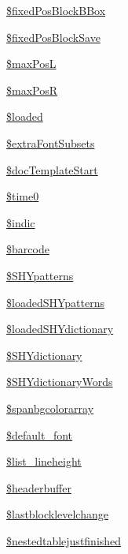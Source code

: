 \begin{DoxyCompactItemize}
\item 
\hyperlink{classm_p_d_f_a6e6d982ac950e78e0e113e46bcd06ccd}{\$fixed\-Pos\-Block\-B\-Box}
\item 
\hyperlink{classm_p_d_f_a64fbbded26ff8ab5ab8451d2afd72f70}{\$fixed\-Pos\-Block\-Save}
\item 
\hyperlink{classm_p_d_f_ad005203af912cab3457f038c57275ea1}{\$max\-Pos\-L}
\item 
\hyperlink{classm_p_d_f_a8ef3950f5776ff51e329692396aa410c}{\$max\-Pos\-R}
\item 
\hyperlink{classm_p_d_f_a2ed77ddd9975c60a758c5704d33a38d7}{\$loaded}
\item 
\hyperlink{classm_p_d_f_a4e95e6e384234e11b16e3ea614509604}{\$extra\-Font\-Subsets}
\item 
\hyperlink{classm_p_d_f_adb5017563e94a07a633448b20f98ef9d}{\$doc\-Template\-Start}
\item 
\hyperlink{classm_p_d_f_a6ba462ae9a2f7efe516165d0939d1784}{\$time0}
\item 
\hyperlink{classm_p_d_f_ab06a380500c6726a902fce12049f18b5}{\$indic}
\item 
\hyperlink{classm_p_d_f_adff8602e70eabc32146ffe70768c0bc8}{\$barcode}
\item 
\hyperlink{classm_p_d_f_a4fe3b2deea6f8dc98af37940a76e09f3}{\$\-S\-H\-Ypatterns}
\item 
\hyperlink{classm_p_d_f_a1682d7e5f531cb9ce024a2ca4f38b695}{\$loaded\-S\-H\-Ypatterns}
\item 
\hyperlink{classm_p_d_f_a43b11646b7a933262fc70cc69e3f4e6f}{\$loaded\-S\-H\-Ydictionary}
\item 
\hyperlink{classm_p_d_f_a54f65cf874ec166233a1e26098b18e35}{\$\-S\-H\-Ydictionary}
\item 
\hyperlink{classm_p_d_f_a118a9e4ed49ccf4b242f37aa7bab5824}{\$\-S\-H\-Ydictionary\-Words}
\item 
\hyperlink{classm_p_d_f_a2af28b49a83efbb7522ef288e703b1d5}{\$spanbgcolorarray}
\item 
\hyperlink{classm_p_d_f_ad235ffb15c4bfc4e902eea8853f54bcd}{\$default\-\_\-font}
\item 
\hyperlink{classm_p_d_f_a7c00e14f9a2182db08779630dbaab245}{\$list\-\_\-lineheight}
\item 
\hyperlink{classm_p_d_f_ade2a892a970b5afb921da08cdeb1877e}{\$headerbuffer}
\item 
\hyperlink{classm_p_d_f_ad7988e0646816181d5788beffbeb1f9f}{\$lastblocklevelchange}
\item 
\hyperlink{classm_p_d_f_a81e8ccd64c27b26deb9e5d641d332805}{\$nestedtablejustfinished}

\end{DoxyCompactItemize}
